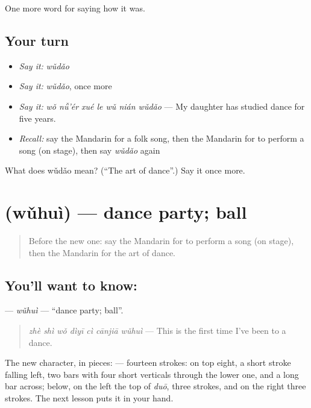\begin{grammarlens}[title={What you've built}]
One more word for saying how it was.
\end{grammarlens}

\subsection*{Your turn}
\begin{itemize}
\raggedright
  \item \emph{Say it:} \emph{wǔdǎo}
  \item \emph{Say it:} \emph{wǔdǎo}, once more
  \item \emph{Say it:} \emph{wǒ nǚ'ér xué le wǔ nián wǔdǎo} — My daughter has studied dance for five years.
  \item \emph{Recall:} say the Mandarin for a folk song, then the Mandarin for to perform a song (on stage), then say \emph{wǔdǎo} again
\end{itemize}

\begin{tcolorbox}[breakable,colback=teal!4,colframe=teal!35!black,title={Before you move on}]
What does wǔdǎo mean? (\textquotedblleft{}The art of dance\textquotedblright{}.) Say it once more.
\end{tcolorbox}
\section[\texorpdfstring{\zh{舞会} (wǔhuì)}{舞会 (wǔhuì)}]{ (wǔhuì) — dance party; ball}

\label{lesson:ZH-C505-wuhui}



\begin{quote}
Before the new one: say the Mandarin for to perform a song (on stage), then the Mandarin for the art of dance.
\end{quote}

\subsection*{You'll want to know: }
\textbf{} — \emph{wǔhuì} — \textquotedblleft{}dance party; ball\textquotedblright{}.

\begin{quote}
\emph{zhè shì wǒ dìyī cì cānjiā wǔhuì} — This is the first time I've been to a dance.
\end{quote}

The new character, in pieces:  — fourteen strokes: on top eight, a short stroke falling left, two bars with four short verticals through the lower one, and a long bar across; below, on the left the top of  \emph{duō}, three strokes, and on the right three strokes. The next lesson puts it in your hand.

